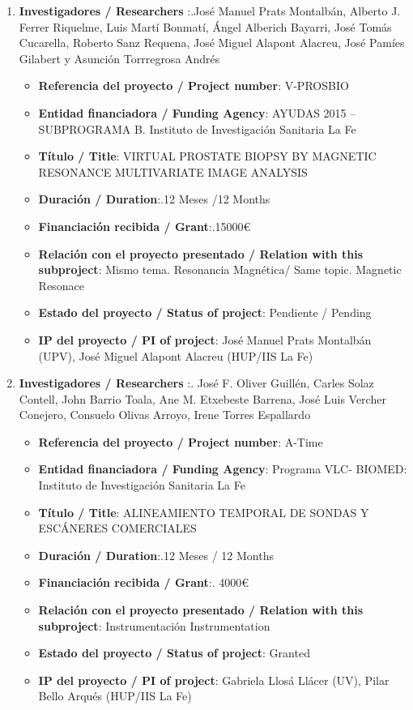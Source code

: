 \begin{enumerate}
 \item {\bf Investigadores / Researchers }:.José Manuel Prats Montalbán, Alberto J. Ferrer Riquelme, Luis Martí Bonmatí, Ángel Alberich Bayarri, José Tomás Cucarella, Roberto Sanz Requena, José Miguel Alapont Alacreu, José Pamíes Gilabert y Asunción Torrregrosa Andrés
 \begin{itemize}
 \item {\bf Referencia del proyecto / Project number}: V-PROSBIO
 \item {\bf Entidad financiadora / Funding Agency}: AYUDAS 2015 – SUBPROGRAMA B. Instituto de Investigación Sanitaria La Fe
 \item {\bf Título / Title}: VIRTUAL PROSTATE BIOPSY BY MAGNETIC RESONANCE MULTIVARIATE IMAGE ANALYSIS 
 \item {\bf Duración / Duration}:.12 Meses /12 Months
 \item {\bf Financiación recibida / Grant}:.15000\euro
 \item {\bf Relación con el proyecto presentado / Relation with this subproject}: Mismo tema. Resonancia Magnética/ Same topic. Magnetic Resonace
 \item {\bf Estado del proyecto / Status of project}: Pendiente / Pending 
 \item {\bf IP del proyecto / PI of project}: José Manuel Prats Montalbán (UPV), José Miguel Alapont Alacreu (HUP/IIS La Fe)
 \end{itemize}

 \item {\bf Investigadores / Researchers }:. José F. Oliver Guillén, Carles Solaz Contell, John Barrio Toala, Ane M. Etxebeste Barrena, José Luis Vercher Conejero, Consuelo Olivas Arroyo, Irene Torres Espallardo
 \begin{itemize}
 \item {\bf Referencia del proyecto / Project number}: A-Time
 \item {\bf Entidad financiadora / Funding Agency}: Programa VLC- BIOMED: Instituto de Investigación Sanitaria La Fe
 \item {\bf Título / Title}: ALINEAMIENTO TEMPORAL DE SONDAS Y ESCÁNERES COMERCIALES  \item {\bf Duración / Duration}:.12 Meses / 12 Months
 \item {\bf Financiación recibida / Grant}:. 4000\euro
 \item {\bf Relación con el proyecto presentado / Relation with this subproject}: Instrumentación Instrumentation
 \item {\bf Estado del proyecto / Status of project}: Granted
 \item {\bf IP del proyecto / PI of project}: Gabriela Llosá Llácer (UV), Pilar Bello Arqués  (HUP/IIS La Fe) 
 \end{itemize}
\end{enumerate}

